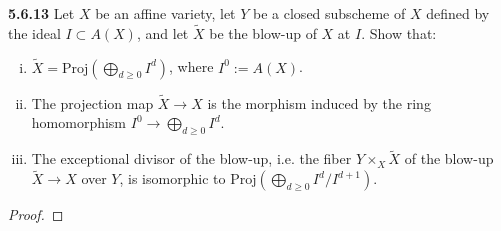 \documentclass[11pt,letterpaper]{report}
\newcommand{\Proj}{\text{Proj}}
\begin{document}
\noindent\textbf{5.6.13}
Let $X$ be an affine variety, let $Y$ be a closed subscheme of $X$ defined by the ideal $I\subset A(X)$, and let $\tilde{X}$ be the blow-up of $X$ at $I$. Show that:
\begin{enumerate}[(i)]
	\item $\tilde{X} = \Proj(\bigoplus_{d\geq 0}I^d)$, where $I^{0}:= A(X)$.
	\item The projection map $\tilde{X}\to X$ is the morphism induced by the ring homomorphism $I^{0}\to \bigoplus_{d\geq 0}I^{d}$.
	\item The exceptional divisor of the blow-up, i.e. the fiber $Y\times_X\tilde{X}$ of the blow-up $\tilde{X}\to X$ over $Y$, is isomorphic to $\Proj(\bigoplus_{d\geq 0}I^{d}/I^{d+1})$.
\end{enumerate}
\begin{proof}
	
\end{proof}
\end{document}
